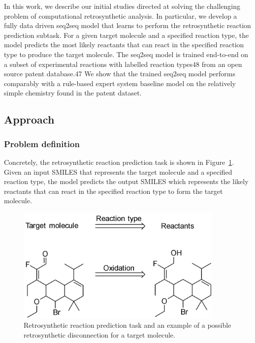In this work, we describe our initial studies directed at solving the challenging problem of computational retrosynthetic analysis. In particular, we develop a fully data driven seq2seq model that learns to perform the retrosynthetic reaction prediction subtask. For a given target molecule and a specified reaction type, the model predicts the most likely reactants that can react in the specified reaction type to produce the target molecule. The seq2seq model is trained end-to-end on a subset of experimental reactions with labelled reaction types48 from an open source patent database.47 We show that the trained seq2seq model performs comparably with a rule-based expert system baseline model on the relatively simple chemistry found in the patent dataset. 

\subsection{Approach}

\subsubsection{Problem definition}
Concretely, the retrosynthetic reaction prediction task is shown in Figure~\ref{fig:ret_problem_example}. Given an input SMILES that represents the target molecule and a specified reaction type, the model predicts the output SMILES which represents the likely reactants that can react in the specified reaction type to form the target molecule. 


\begin{figure}
  \centering
  \includegraphics[width=0.9\textwidth]{Images/ret_problem_definition.png}
  \caption{Retrosynthetic reaction prediction task and an example of a possible retrosynthetic disconnection for a target molecule.}
  \label{fig:ret_problem_example}
\end{figure}

